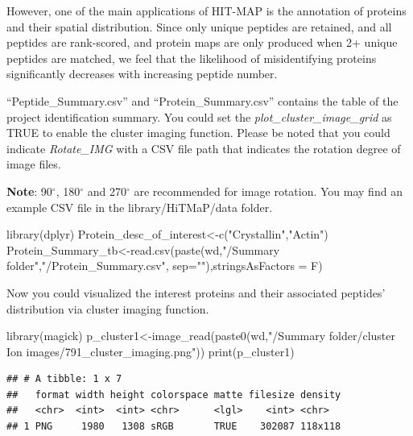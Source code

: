 \documentclass[
]{article}
\newenvironment{Shaded}{\begin{snugshade}}{\end{snugshade}}
\newcommand{\AttributeTok}[1]{\textcolor[rgb]{0.77,0.63,0.00}{#1}}
\newcommand{\FunctionTok}[1]{\textcolor[rgb]{0.00,0.00,0.00}{#1}}
\newcommand{\NormalTok}[1]{#1}
\newcommand{\OtherTok}[1]{\textcolor[rgb]{0.56,0.35,0.01}{#1}}
\newcommand{\StringTok}[1]{\textcolor[rgb]{0.31,0.60,0.02}{#1}}
\begin{document}
However, one of the main applications of HIT-MAP is the annotation of
proteins and their spatial distribution. Since only unique peptides are
retained, and all peptides are rank-scored, and protein maps are only
produced when 2+ unique peptides are matched, we feel that the
likelihood of misidentifying proteins significantly decreases with
increasing peptide number.

``Peptide\_Summary.csv'' and ``Protein\_Summary.csv'' contains the table
of the project identification summary. You could set the
\emph{plot\_cluster\_image\_grid} as TRUE to enable the cluster imaging
function. Please be noted that you could indicate \emph{Rotate\_IMG}
with a CSV file path that indicates the rotation degree of image files.

\textbf{Note}: 90\(^\circ\), 180\(^\circ\) and 270\(^\circ\) are
recommended for image rotation. You may find an example CSV file in the
library/HiTMaP/data folder.

\begin{Shaded}
\begin{Highlighting}[]
\FunctionTok{library}\NormalTok{(dplyr)}
\NormalTok{Protein\_desc\_of\_interest}\OtherTok{\textless{}{-}}\FunctionTok{c}\NormalTok{(}\StringTok{"Crystallin"}\NormalTok{,}\StringTok{"Actin"}\NormalTok{)}
\NormalTok{Protein\_Summary\_tb}\OtherTok{\textless{}{-}}\FunctionTok{read.csv}\NormalTok{(}\FunctionTok{paste}\NormalTok{(wd,}\StringTok{"/Summary folder"}\NormalTok{,}\StringTok{"/Protein\_Summary.csv"}\NormalTok{, }\AttributeTok{sep=}\StringTok{""}\NormalTok{),}\AttributeTok{stringsAsFactors =}\NormalTok{ F)}
\end{Highlighting}
\end{Shaded}

Now you could visualized the interest proteins and their associated
peptides' distribution via cluster imaging function.

\begin{Shaded}
\begin{Highlighting}[]
\FunctionTok{library}\NormalTok{(magick)}
\NormalTok{p\_cluster1}\OtherTok{\textless{}{-}}\FunctionTok{image\_read}\NormalTok{(}\FunctionTok{paste0}\NormalTok{(wd,}\StringTok{"/Summary folder/cluster Ion images/791\_cluster\_imaging.png"}\NormalTok{))}
\FunctionTok{print}\NormalTok{(p\_cluster1)}
\end{Highlighting}
\end{Shaded}

\begin{verbatim}
## # A tibble: 1 x 7
##   format width height colorspace matte filesize density
##   <chr>  <int>  <int> <chr>      <lgl>    <int> <chr>  
## 1 PNG     1980   1308 sRGB       TRUE    302087 118x118
\end{verbatim}
\end{document}
